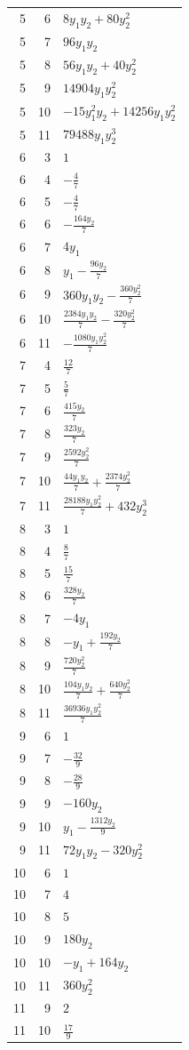 \documentclass[10pt,a4paper]{article}
\begin{document}
{\begin{longtable}{rrp{125mm}}
5 & 6 & $8 y_{1} y_{2} + 80 y_{2}^{2}$\\
5 & 7 & $96 y_{1} y_{2}$\\
5 & 8 & $56 y_{1} y_{2} + 40 y_{2}^{2}$\\
5 & 9 & $14904 y_{1} y_{2}^{2}$\\
5 & 10 & $- 15 y_{1}^{2} y_{2} + 14256 y_{1} y_{2}^{2}$\\
5 & 11 & $79488 y_{1} y_{2}^{3}$\\
6 & 3 & $1$\\
6 & 4 & $- \frac{4}{7}$\\
6 & 5 & $- \frac{4}{7}$\\
6 & 6 & $- \frac{164 y_{2}}{7}$\\
6 & 7 & $4 y_{1}$\\
6 & 8 & $y_{1} - \frac{96 y_{2}}{7}$\\
6 & 9 & $360 y_{1} y_{2} - \frac{360 y_{2}^{2}}{7}$\\
6 & 10 & $\frac{2384 y_{1} y_{2}}{7} - \frac{320 y_{2}^{2}}{7}$\\
6 & 11 & $- \frac{1080 y_{1} y_{2}^{2}}{7}$\\
7 & 4 & $\frac{12}{7}$\\
7 & 5 & $\frac{5}{7}$\\
7 & 6 & $\frac{415 y_{2}}{7}$\\
7 & 8 & $\frac{323 y_{2}}{7}$\\
7 & 9 & $\frac{2592 y_{2}^{2}}{7}$\\
7 & 10 & $\frac{44 y_{1} y_{2}}{7} + \frac{2374 y_{2}^{2}}{7}$\\
7 & 11 & $\frac{28188 y_{1} y_{2}^{2}}{7} + 432 y_{2}^{3}$\\
8 & 3 & $1$\\
8 & 4 & $\frac{8}{7}$\\
8 & 5 & $\frac{15}{7}$\\
8 & 6 & $\frac{328 y_{2}}{7}$\\
8 & 7 & $- 4 y_{1}$\\
8 & 8 & $- y_{1} + \frac{192 y_{2}}{7}$\\
8 & 9 & $\frac{720 y_{2}^{2}}{7}$\\
8 & 10 & $\frac{104 y_{1} y_{2}}{7} + \frac{640 y_{2}^{2}}{7}$\\
8 & 11 & $\frac{36936 y_{1} y_{2}^{2}}{7}$\\
9 & 6 & $1$\\
9 & 7 & $- \frac{32}{9}$\\
9 & 8 & $- \frac{28}{9}$\\
9 & 9 & $- 160 y_{2}$\\
9 & 10 & $y_{1} - \frac{1312 y_{2}}{9}$\\
9 & 11 & $72 y_{1} y_{2} - 320 y_{2}^{2}$\\
10 & 6 & $1$\\
10 & 7 & $4$\\
10 & 8 & $5$\\
10 & 9 & $180 y_{2}$\\
10 & 10 & $- y_{1} + 164 y_{2}$\\
10 & 11 & $360 y_{2}^{2}$\\
11 & 9 & $2$\\
11 & 10 & $\frac{17}{9}$\\
\end{longtable}}
\end{document}
